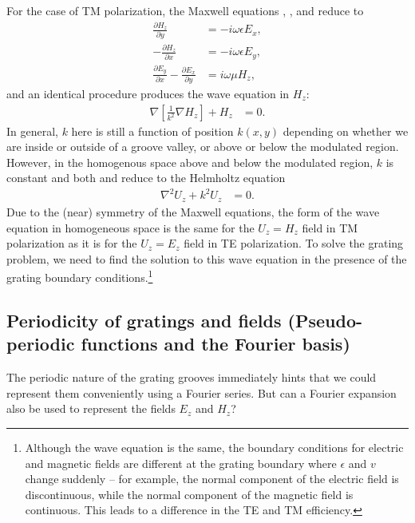For the case of TM polarization, the Maxwell equations , , and  reduce to 
\begin{align}
\frac{\partial H_z}{\partial y} &= -i \omega \epsilon E_x, \\
-\frac{\partial H_z}{\partial x} &= -i \omega \epsilon E_y, \\
\frac{\partial E_y}{\partial x} - \frac{\partial E_x}{\partial y} &= i \omega \mu H_z,
\end{align}
and an identical procedure produces the wave equation in $H_z$:
\begin{align}
\label{wetm}
\nabla\left[  \frac{1}{k^2} \nabla H_z  \right] + H_z &= 0.%
\end{align}
In general, $k$ here is still a function of position $k(x,y)$ depending on whether we are inside or outside of a groove valley, or above or below the modulated region.  However, in the homogenous space above and below the modulated region, $k$ is constant and both  and  reduce to the Helmholtz equation
\begin{align}
\nabla^2 U_z + k^2 U_z &= 0.
\end{align}
Due to the (near) symmetry of the Maxwell equations, the form of the wave equation in homogeneous space is the same for the $U_z = H_z$ field in TM polarization as it is for the $U_z = E_z$ field in TE polarization.  To solve the grating problem, we need to find the solution to this wave equation in the presence of the grating boundary conditions.\footnote{Although the wave equation is the same, the boundary conditions for electric and magnetic fields are different at the grating boundary where $\epsilon$ and $v$ change suddenly -- for example, the normal component of the electric field is discontinuous, while the normal component of the magnetic field is continuous. This leads to a difference in the TE and TM efficiency.}
\subsection{Periodicity of gratings and fields (Pseudo-periodic functions and the Fourier basis)}
The periodic nature of the grating grooves immediately hints that we could represent them conveniently using a Fourier series.  But can a Fourier expansion also be used to represent the fields $E_z$ and $H_z$?

